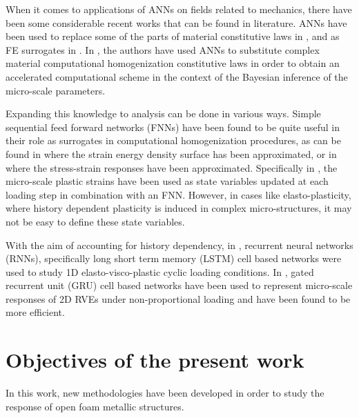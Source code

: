 When it comes to applications of ANNs on fields related to mechanics, there have been some considerable recent works that can be found in literature. ANNs have been used to replace some of the parts of  material constitutive  laws in \cite{furukawaImplicitConstitutiveModelling1998,furukawaAccurateCyclicPlastic2004,wangMetamodelingGameDeriving2019}, and as FE surrogates in \cite{lefikArtificialNeuralNetwork2003,hashashNumericalImplementationNeural2004,zhangUsingNeuralNetworks2020}. In \cite{wuBayesianInferenceNonlinear2020}, the authors have used ANNs to substitute complex material computational homogenization constitutive laws in order to obtain an accelerated computational scheme in the context of the Bayesian inference of the micro-scale parameters.

Expanding this knowledge to \fee analysis can be done in various ways. Simple sequential feed forward networks (FNNs) have been found to be quite useful in their role as surrogates in computational homogenization procedures, as can be found in \cite{leComputationalHomogenizationNonlinear2015,bessaFrameworkDatadrivenAnalysis2017} where the strain energy density surface has been approximated, or in \cite{fritzenOntheflyAdaptivityNonlinear2019,ungerCouplingScalesMultiscale2008,settgastHybridApproachSimulate2020} where the stress-strain responses have been approximated. Specifically in \cite{settgastHybridApproachSimulate2020}, the micro-scale plastic strains have been used as state variables updated at each loading step in combination with an FNN. However, in cases like elasto-plasticity, where history dependent plasticity is induced in complex micro-structures, it may not be easy to define these state variables.

With the aim of accounting for history dependency, in \cite{ghavamianAcceleratingMultiscaleFinite2019}, recurrent neural networks (RNNs), specifically long short term memory (LSTM) cell based networks were used to study 1D elasto-visco-plastic cyclic loading conditions. In \cite{wuRecurrentNeuralNetworkaccelerated2020,gorjiPotentialRecurrentNeural2020}, gated recurrent unit (GRU) cell based networks have been used to represent micro-scale responses of 2D RVEs under non-proportional loading and have been found to be more efficient.

\section{Objectives of the present work}

In this work, new methodologies have been developed in order to study the response of open foam metallic structures. 

